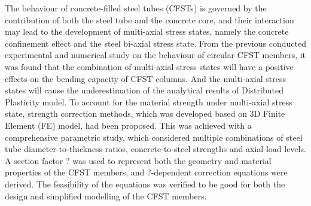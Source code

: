 \abstract
The behaviour of concrete-filled steel tubes (CFSTs) is governed by the contribution of both the steel tube and the concrete core, and their interaction may lead to the development of multi-axial stress states, namely the concrete confinement effect and the steel bi-axial stress state. From the previous conducted experimental and numerical study on the behaviour of circular CFST members, it was found that the combination of multi-axial stress states will have a positive effects on the bending capacity of CFST columns. And the multi-axial stress states will cause the underestimation of the analytical results of Distributed Plasticity model. To account for the material strength under multi-axial stress state, strength correction methods, which was developed based on 3D Finite Element (FE) model, had been proposed. This was achieved with a comprehensive parametric study, which considered multiple combinations of steel tube diameter-to-thickness ratios, concrete-to-steel strengths and axial load levels. A section factor ? was used to represent both the geometry and material properties of the CFST members, and ?-dependent correction equations were derived. The feasibility of the equations was verified to be good for both the design and simplified modelling of the CFST members.
